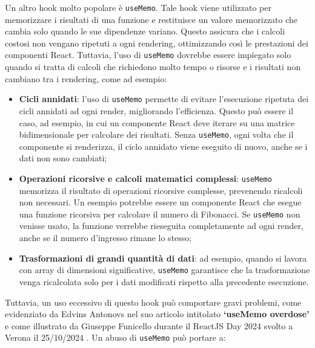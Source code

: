 \documentclass[target=bach,aauheader=,style=]{thud}
\begin{document}
\noindent Un altro hook molto popolare è \texttt{useMemo}. Tale hook viene utilizzato per memorizzare i risultati di una funzione e restituisce un valore memorizzato che cambia solo quando le sue dipendenze variano. Questo assicura che i calcoli costosi non vengano ripetuti a ogni rendering, ottimizzando così le prestazioni dei componenti React. Tuttavia, l'uso di \texttt{useMemo} dovrebbe essere impiegato solo quando si tratta di calcoli che richiedono molto tempo o risorse e i risultati non cambiano tra i rendering, come ad esempio:

\begin{itemize}
    \item \textbf{Cicli annidati}: l'uso di \texttt{useMemo} permette di evitare l'esecuzione ripetuta dei cicli annidati ad ogni render, migliorando l'efficienza. Questo può essere il caso, ad esempio, in cui un componente React deve iterare su una matrice bidimensionale per calcolare dei risultati. Senza \texttt{useMemo}, ogni volta che il componente si renderizza, il ciclo annidato viene eseguito di nuovo, anche se i dati non sono cambiati;
    \item \textbf{Operazioni ricorsive e calcoli matematici complessi}: \texttt{useMemo} memorizza il risultato di operazioni ricorsive complesse, prevenendo ricalcoli non necessari. Un esempio potrebbe essere un componente React che esegue una funzione ricorsiva per calcolare il numero di Fibonacci. Se \texttt{useMemo} non venisse usato, la funzione verrebbe rieseguita completamente ad ogni render, anche se il numero d'ingresso rimane lo stesso;
    \item \textbf{Trasformazioni di grandi quantità di dati}: ad esempio, quando si lavora con array di dimensioni significative, \texttt{useMemo} garantisce che la trasformazione venga ricalcolata solo per i dati modificati rispetto alla precedente esecuzione.
\end{itemize}

\noindent Tuttavia, un uso eccessivo di questo hook può comportare gravi problemi, come evidenziato da Edvins Antonovs nel suo articolo intitolato \textbf{`useMemo overdose'} \cite{edvins2024usememo} e come illustrato da Giuseppe Funicello durante il ReactJS Day 2024 svolto a Verona il 25/10/2024 \cite{funicello2024reactjsday}. Un abuso di \texttt{useMemo} può portare a:
\end{document}
